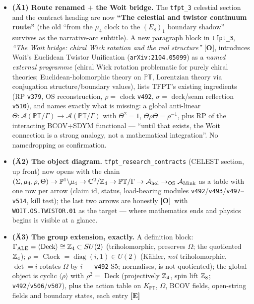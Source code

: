 \documentclass[11pt]{article}
\providecommand{\mE}{\textbf{[E]}}\providecommand{\mC}{\textbf{[C]}}
\providecommand{\mO}{\textbf{[O]}}\providecommand{\mX}{\textbf{[X]}}
\begin{document}
\begin{itemize}[leftmargin=1.5em]
\item \textbf{(\"A1) Route renamed $+$ the Woit bridge.} The \texttt{tfpt\_3} celestial section and the
contract heading are now \textbf{``The celestial and twistor continuum route''} (the old ``from the
$\mu_4$ clock to the $(E_8)_1$ boundary shadow'' survives as the narrative-arc subtitle). A new
paragraph block in \texttt{tfpt\_3}, \emph{``The Woit bridge: chiral Wick rotation and the real
structure''} \mO, introduces Woit's Euclidean Twistor Unification (\texttt{arXiv:2104.05099}) as a
\emph{named external programme} (chiral Wick rotation problematic for purely chiral theories;
Euclidean-holomorphic theory on $\mathbb{PT}$, Lorentzian theory via conjugation
structure/boundary values), lists TFPT's existing ingredients (RP \texttt{v379}, OS reconstruction,
$\rho=$ clock \texttt{v492}, $\sigma=$ deck/seam reflection \texttt{v510}), and names exactly what
is missing: a global anti-linear $\Theta:\mathcal A(\mathbb{PT}/\Gamma)\to\mathcal
A(\mathbb{PT}/\Gamma)$ with $\Theta^2=1$, $\Theta\rho\Theta=\rho^{-1}$, plus RP of the interacting
BCOV$+$SDYM functional --- ``until that exists, the Woit connection is a strong analogy, not a
mathematical integration''. No namedropping as confirmation.
\item \textbf{(\"A2) The object diagram.} \texttt{tfpt\_research\_contracts} (CELEST section, up
front) now opens with the chain $(\Sigma,\mu_4,\rho,\Theta)\to\mathbb
P^1{\setminus}\mu_4\to\mathbb C^2/\mathbb{Z}_4\to\mathbb{PT}/\Gamma\to\mathcal
A_{\mathrm{hol}}\to_{\mathrm{OS}}\mathcal A_{\mathrm{Mink}}$ as a table with one row per arrow
(claim id, status, load-bearing modules \texttt{v492}/\texttt{v493}/\texttt{v497}--\texttt{v514},
kill test); the last two arrows are honestly \mO\ with \texttt{WOIT.OS.TWISTOR.01} as the target ---
where mathematics ends and physics begins is visible at a glance.
\item \textbf{(\"A3) The group extension, exactly.} A definition block:
$\Gamma_{\mathrm{ALE}}=\langle\text{Deck}\rangle\cong\mathbb{Z}_4\subset SU(2)$ (triholomorphic, preserves
$\Omega$; the quotiented $\mathbb{Z}_4$); $\rho=$ Clock $=\operatorname{diag}(i,1)\in U(2)$ (K\"ahler,
\emph{not} triholomorphic, $\det=i$ rotates $\Omega$ by $i$ --- \texttt{v492} S5; normalises, is not
quotiented); the global object is cyclic $\langle\rho\rangle$ with $\rho^2=$ Deck (projectively
$\mathbb{Z}_4$, spin lift $\mathbb{Z}_8$; \texttt{v492}/\texttt{v506}/\texttt{v507}), plus the action table on
$K_{\mathbb{PT}}$, $\Omega$, BCOV fields, open-string fields and boundary states, each entry \mE\

\end{itemize}
\end{document}
